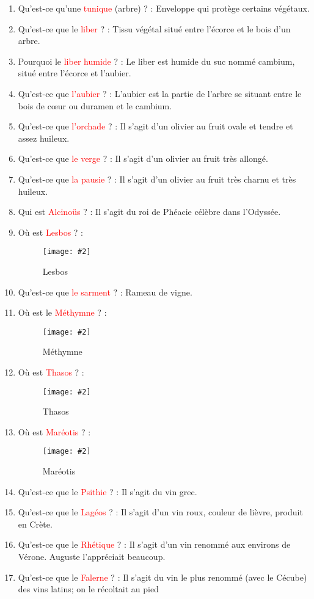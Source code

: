 \documentclass[a4paper, 11pt, hidelinks]{article}
\newcommand{\img}[4]{\begin{figure}[!ht]
    \centering
    \texttt{[image: \#2]}
    \caption{#3}
    \label{#4}
    \end{figure} }
\begin{document}
\begin{enumerate}
            \img{0.5}{orne.jpg}{Orne}{61}
            \item Qu'est-ce qu'une \textcolor{red}{tunique} (arbre) ? : Enveloppe qui protège certains végétaux.
            \item Qu'est-ce que le \textcolor{red}{liber} ? : Tissu végétal situé entre l'écorce et le bois d'un arbre.
            \item Pourquoi le \textcolor{red}{liber humide} ? : Le liber est humide du suc nommé cambium, situé entre l'écorce et l'aubier.
            \item Qu'est-ce que \textcolor{red}{l'aubier} ? : L'aubier est la partie de l’arbre se situant entre le bois de cœur ou duramen et le cambium.
            \item Qu'est-ce que \textcolor{red}{l'orchade} ? : Il s'agit d'un olivier au fruit ovale et tendre et assez huileux.
            \item Qu'est-ce que \textcolor{red}{le verge} ? : Il s'agit d'un olivier au fruit très allongé.
            \item Qu'est-ce que \textcolor{red}{la pausie} ? : Il s'agit d'un olivier au fruit très charnu et très huileux.
            \item Qui est \textcolor{red}{Alcinoüs} ? : Il s'agit du roi de Phéacie célèbre dans l'Odyssée.
            \item Où est \textcolor{red}{Lesbos} ? :
            \img{0.4}{Lesbos.png}{Lesbos}{65}
            \item Qu'est-ce que \textcolor{red}{le sarment} ? : Rameau de vigne.
            \item Où est le \textcolor{red}{Méthymne} ? :
                  \img{0.4}{Methymne.png}{Méthymne}{66}
            \item Où est \textcolor{red}{Thasos} ? :
                  \img{0.4}{Thasos.png}{Thasos}{67}
            \item Où est \textcolor{red}{Maréotis} ? :
                  \img{0.4}{Mareotis.png}{Maréotis}{68}
            \item Qu'est-ce que le \textcolor{red}{Psithie} ? : Il s'agit du vin grec.
            \item Qu'est-ce que le \textcolor{red}{Lagéos} ? : Il s'agit d'un vin roux, couleur de lièvre, produit en Crète.
            \item Qu'est-ce que le \textcolor{red}{Rhétique} ? : Il s'agit d'un vin renommé aux environs de Vérone. Auguste l'appréciait beaucoup.
            \item Qu'est-ce que le \textcolor{red}{Falerne} ? : Il s'agit du vin le plus renommé (avec le Cécube) des vins latins; on le récoltait au pied

\end{enumerate}
\end{document}
